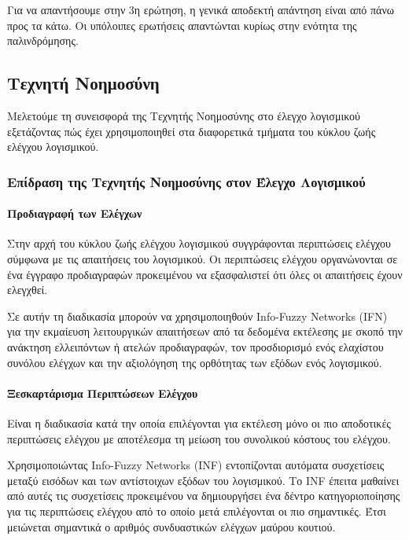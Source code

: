 \documentclass[12pt]{article}
\begin{document}
\par Για να απαντήσουμε στην 3η ερώτηση, η γενικά αποδεκτή απάντηση είναι από πάνω προς τα κάτω. Οι υπόλοιπες ερωτήσεις απαντώνται κυρίως στην ενότητα της παλινδρόμησης.

\subsection{Τεχνητή Νοημοσύνη}

\par Μελετούμε τη συνεισφορά της Τεχνητής Νοημοσύνης στο έλεγχο λογισμικού εξετάζοντας πώς έχει χρησιμοποιηθεί στα διαφορετικά τμήματα του κύκλου ζωής ελέγχου λογισμικού.

\subsubsection{Επίδραση της Τεχνητής Νοημοσύνης στον Έλεγχο Λογισμικού} 

\paragraph{Προδιαγραφή των Ελέγχων \cite{zubair}}
Στην αρχή του κύκλου ζωής ελέγχου λογισμικού συγγράφονται περιπτώσεις ελέγχου σύμφωνα με τις απαιτήσεις του λογισμικού. Οι περιπτώσεις ελέγχου οργανώνονται σε ένα έγγραφο προδιαγραφών προκειμένου να εξασφαλιστεί ότι όλες οι απαιτήσεις έχουν ελεγχθεί.
\par Σε αυτήν τη διαδικασία μπορούν να χρησιμοποιηθούν Info-Fuzzy Networks (IFN) για την εκμαίευση λειτουργικών απαιτήσεων από τα δεδομένα εκτέλεσης με σκοπό την ανάκτηση ελλειπόντων ή ατελών προδιαγραφών, τον προσδιορισμό ενός ελαχίστου συνόλου ελέγχων και την αξιολόγηση της ορθότητας των εξόδων ενός λογισμικού.

\paragraph{Ξεσκαρτάρισμα Περιπτώσεων Ελέγχου}
Είναι η διαδικασία κατά την οποία επιλέγονται για εκτέλεση μόνο οι πιο αποδοτικές περιπτώσεις ελέγχου με αποτέλεσμα τη μείωση του συνολικού κόστους του ελέγχου.
\par Χρησιμοποιώντας Info-Fuzzy Networks (INF) εντοπίζονται αυτόματα συσχετίσεις μεταξύ εισόδων και των αντίστοιχων εξόδων του λογισμικού. Το INF έπειτα μαθαίνει από αυτές τις συσχετίσεις προκειμένου να δημιουργήσει ένα δέντρο κατηγοριοποίησης για τις περιπτώσεις ελέγχου από το οποίο μετά επιλέγονται οι πιο σημαντικές. Έτσι μειώνεται σημαντικά ο αριθμός συνδυαστικών ελέγχων μαύρου κουτιού.
\end{document}
